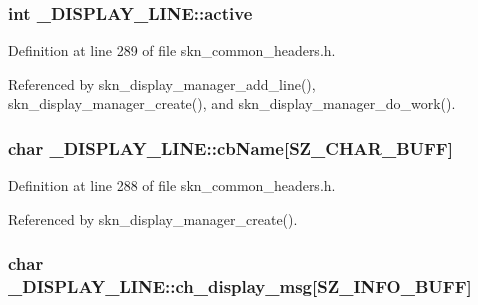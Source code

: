 \subsubsection[{active}]{\setlength{\rightskip}{0pt plus 5cm}int \+\_\+\+D\+I\+S\+P\+L\+A\+Y\+\_\+\+L\+I\+N\+E\+::active}\label{struct___d_i_s_p_l_a_y___l_i_n_e_acf235d7965b9d52439add787b8e3d316}


Definition at line 289 of file skn\+\_\+common\+\_\+headers.\+h.



Referenced by skn\+\_\+display\+\_\+manager\+\_\+add\+\_\+line(), skn\+\_\+display\+\_\+manager\+\_\+create(), and skn\+\_\+display\+\_\+manager\+\_\+do\+\_\+work().

\hypertarget{struct___d_i_s_p_l_a_y___l_i_n_e_a3a374d209578adb1d4cea933756fb14a}{}
\subsubsection[{cb\+Name}]{\setlength{\rightskip}{0pt plus 5cm}char \+\_\+\+D\+I\+S\+P\+L\+A\+Y\+\_\+\+L\+I\+N\+E\+::cb\+Name\mbox{[}{\bf S\+Z\+\_\+\+C\+H\+A\+R\+\_\+\+B\+U\+F\+F}\mbox{]}}\label{struct___d_i_s_p_l_a_y___l_i_n_e_a3a374d209578adb1d4cea933756fb14a}


Definition at line 288 of file skn\+\_\+common\+\_\+headers.\+h.



Referenced by skn\+\_\+display\+\_\+manager\+\_\+create().

\hypertarget{struct___d_i_s_p_l_a_y___l_i_n_e_ae5fae9b599281d1d3f619b6e402e7c2c}{}
\subsubsection[{ch\+\_\+display\+\_\+msg}]{\setlength{\rightskip}{0pt plus 5cm}char \+\_\+\+D\+I\+S\+P\+L\+A\+Y\+\_\+\+L\+I\+N\+E\+::ch\+\_\+display\+\_\+msg\mbox{[}{\bf S\+Z\+\_\+\+I\+N\+F\+O\+\_\+\+B\+U\+F\+F}\mbox{]}}\label{struct___d_i_s_p_l_a_y___l_i_n_e_ae5fae9b599281d1d3f619b6e402e7c2c}


